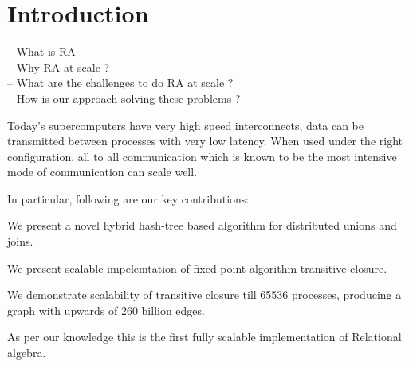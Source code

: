 

\section{Introduction}
\label{sec:intro}
%


-- What is RA \\
-- Why RA at scale ? \\
-- What are the challenges to do RA at scale ? \\
-- How is our approach solving these problems ?

Today's supercomputers have very high speed interconnects, data can be transmitted between processes with very low latency. 
When used under the right configuration, all to all communication which is known to be the most intensive mode of communication can scale well.


In particular, following are our key contributions:
\begin{tightenumerate}
	\item We present a novel hybrid hash-tree based algorithm for distributed unions and joins.
	\item We present scalable impelemtation of fixed point algorithm transitive closure.
	\item We demonstrate scalability of transitive closure till 65536 processes, producing a graph with upwards of 260 billion edges. 
\end{tightenumerate}

As per our knowledge this is the first fully scalable implementation of Relational algebra.





